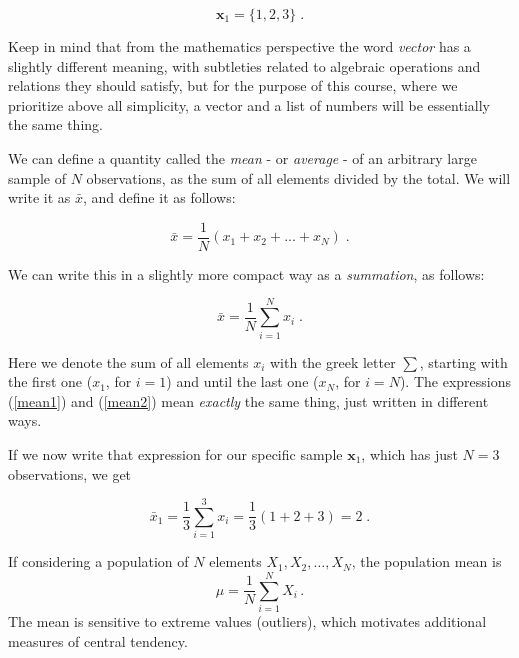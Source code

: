 \documentclass{book}
\begin{document}
\begin{equation}
	\textbf{x}_{1} = \{1, 2, 3\} \; . \nonumber  
\end{equation}

Keep in mind that from the mathematics perspective the word \textit{vector} has a slightly different meaning, with subtleties related to algebraic operations and relations they should satisfy, but for the purpose of this course, where we prioritize above all simplicity, a vector and a list of numbers will be essentially the same thing.

\medskip

We can define a quantity called the \textit{mean} - or \textit{average} - of an arbitrary large sample of $N$ observations, as the sum of all elements divided by the total. We will write it as $\bar{x}$, and define it as follows:

\begin{equation}
	\bar{x} = \frac{1}{N} (x_{1} + x_{2} + ... + x_{N}) \; .
	\label{mean1}
\end{equation}

We can write this in a slightly more compact way as a \textit{summation}, as follows:

\begin{equation}
	\bar{x} = \frac{1}{N} \sum_{i = 1}^{N} x_{i} \; .
	\label{mean2}
\end{equation}

Here we denote the sum of all elements $x_{i}$ with the greek letter $\sum$, starting with the first one ($x_1$, for $i = 1$) and until the last one ($x_N$, for $i = N$). The expressions (\ref{mean1}) and (\ref{mean2}) mean \textit{exactly} the same thing, just written in different ways.

\medskip

If we now write that expression for our specific sample $\textbf{x}_{1}$, which has just $N = 3$ observations, we get

\begin{equation}
	\bar{x}_{1} = \frac{1}{3} \sum_{i = 1}^{3} x_{i} = \frac{1}{3} (1 + 2 + 3) = 2 \; . \nonumber
\end{equation}

If considering a population of $N$ elements $X_1, X_2, \dots, X_N$, the population mean is
\begin{equation}
	\mu = \frac{1}{N} \sum_{i=1}^{N} X_i \, .
\end{equation}
The mean is sensitive to extreme values (outliers), which motivates additional measures of central tendency.
\end{document}
